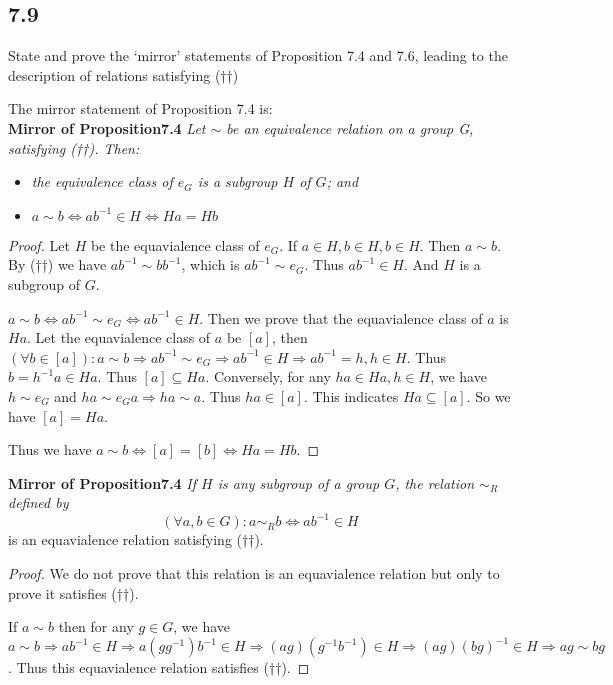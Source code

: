 \documentclass[a4paper, pdf, 12pt]{article}
\begin{document}
\subsection*{7.9}
State and prove the ‘mirror’ statements of Proposition 7.4 and 7.6, leading to
the description of relations satisfying (††)

\noindent
The mirror statement of Proposition 7.4 is:\\

\noindent
\textbf{Mirror of Proposition7.4}
\textit{Let $\sim$ be an equivalence relation on a group G, satisfying (††).
Then:}
\begin{itemize}
  \item \textit{the equivalence class of $e_G$ is a subgroup $H$ of $G$; and}
  \item $a\sim b\Longleftrightarrow ab^{-1}\in H \Longleftrightarrow Ha=Hb$ 
\end{itemize}

\begin{proof}
  Let $H$ be the equavialence class of $e_{G}$. If $a\in H, b\in H, b\in H$. Then $a\sim b$.
  By (††) we have $ab^{-1}\sim bb^{-1}$, which is $ab^{-1}\sim e_{G}$. Thus $ab^{-1}\in H$. And 
  $H$ is a subgroup of $G$.

  $a\sim b\Longleftrightarrow ab^{-1}\sim e_{G}\Longleftrightarrow ab^{-1} \in H$.
  Then we prove that the equavialence class of $a$ is $Ha$. Let the equavialence class of $a$ be 
  $[a]$, then $(\forall b\in [a]): a\sim b\Rightarrow ab^{-1}\sim e_{G}\Rightarrow ab^{-1} \in H\Rightarrow ab^{-1} = h,h\in H$.
  Thus $b = h^{-1}a \in Ha$. Thus $[a]\subseteq Ha$. Conversely, for any $ha\in Ha, h\in H$, we have $h\sim e_{G}$ and $ha\sim e_{G}a\Rightarrow ha\sim a$.
  Thus $ha\in [a]$. This indicates $Ha\subseteq [a]$. So we have $[a] = Ha$.

  Thus we have $a\sim b\Longleftrightarrow [a] = [b] \Longleftrightarrow Ha=Hb$.
\end{proof}

\noindent
\textbf{Mirror of Proposition7.4} 
\textit{If $H$ is any subgroup of a group $G$, the relation $\sim_{R}$ defined by}
$$
(\forall a,b\in G):a\sim_{R} b\Longleftrightarrow ab^{-1}\in H
$$
is an equavialence relation satisfying (††).
\begin{proof}
  We do not prove that this relation is an equavialence relation but only to prove it 
  satisfies (††).

  If $a\sim b$ then for any $g\in G$, we have $a\sim b\Rightarrow ab^{-1}\in H\Rightarrow a(gg^{-1})b^{-1}\in H\Rightarrow (ag)(g^{-1}b^{-1})\in H
  \Rightarrow (ag)(bg)^{-1}\in H\Rightarrow ag\sim bg
  $.
  Thus this equavialence relation satisfies (††).
\end{proof}
\end{document}
